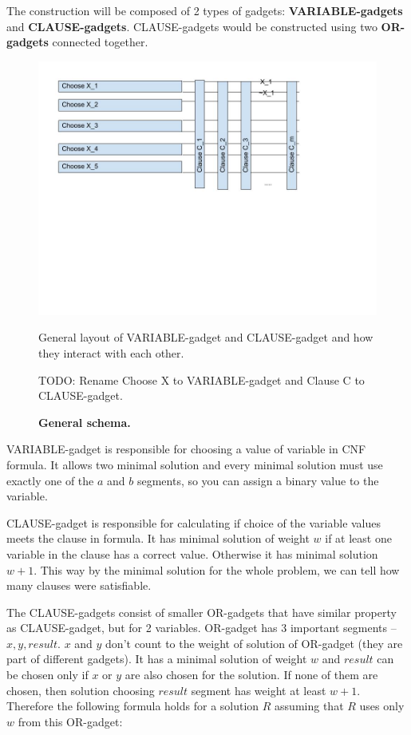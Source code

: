 The construction will be composed of 2 types of gadgets:
\textbf{VARIABLE-gadgets} and \textbf{CLAUSE-gadgets}.
CLAUSE-gadgets would be constructed using two \textbf{OR-gadgets}
connected together.


\begin{figure}
\centering
\includegraphics[width=\linewidth]{segment_apx_sketch.jpg}
\caption{\textbf{General schema.}}
General layout of VARIABLE-gadget and CLAUSE-gadget and how they
interact with each other.

TODO: Rename Choose X to VARIABLE-gadget and Clause C to CLAUSE-gadget.
\label{fig:segment_apx_sketch}
\end{figure}

VARIABLE-gadget is responsible for choosing a value of variable
in CNF formula. It allows two minimal solution
and every minimal solution must use exactly one of the $a$ and $b$
segments, so you can assign  a binary value to the variable.

CLAUSE-gadget is responsible for calculating if choice of the
variable values meets the clause in formula.
It has minimal solution of weight $w$ if at least one variable
in the clause has a correct value.
Otherwise it has minimal solution $w+1$.
This way by the minimal solution for the whole problem, we can tell
how many clauses were satisfiable.

The CLAUSE-gadgets consist of smaller OR-gadgets that have similar
property as CLAUSE-gadget, but for 2 variables.
OR-gadget has 3 important segments
-- $x, y, result$. $x$ and $y$ don't count to the weight of solution
of OR-gadget (they are part of different gadgets).
It has a minimal solution of weight $w$
and $result$ can be chosen only if $x$ or $y$ are also chosen
for the solution.
If none of them are chosen, then solution
choosing $result$ segment has weight at least $w+1$.
Therefore the following formula holds for a solution $R$
assuming that $R$ uses only $w$ from this OR-gadget:

